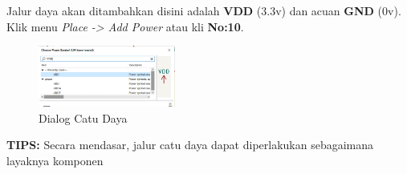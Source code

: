 \documentclass[12pt]{book}
\begin{document}
	Jalur daya akan ditambahkan disini adalah \textbf{VDD} (3.3v) dan acuan \textbf{GND} (0v).
	Klik menu \textit{Place -> Add Power} atau kli \textbf{No:10}.

	\begin{figure}[!ht]
		\centering
		\includegraphics[width=0.4\textwidth]{images/sch/sch_8}
		\caption{Dialog Catu Daya}
	\end{figure}

	\textbf{TIPS:} Secara mendasar, jalur catu daya dapat diperlakukan sebagaimana layaknya komponen
\end{document}
